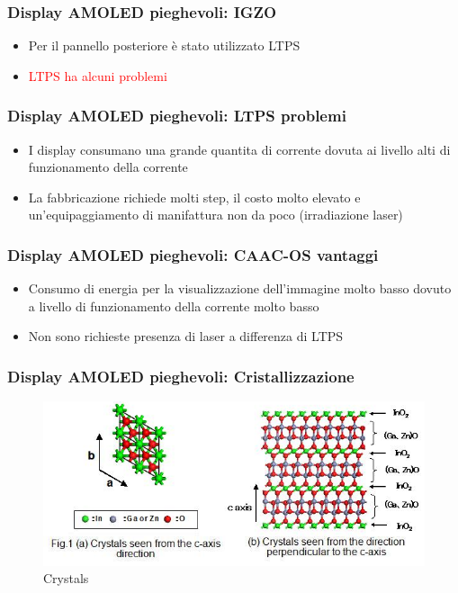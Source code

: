 \documentclass[12pt]{beamer}
\begin{document}
	\begin{frame}
		\frametitle{Display AMOLED pieghevoli: IGZO}
		\begin{itemize}
			\item Per il pannello posteriore è stato utilizzato LTPS
			\pause
			\item \textcolor{red}{LTPS ha alcuni problemi}
		\end{itemize}
	\end{frame}
	\begin{frame}
		\frametitle{Display AMOLED pieghevoli: LTPS problemi}
		\begin{itemize}
			\item I display consumano una grande quantita di corrente dovuta ai livello alti di funzionamento della corrente
			\pause
			\item La fabbricazione richiede molti step, il costo molto elevato e un'equipaggiamento di manifattura non da poco (irradiazione laser)
		\end{itemize}
	\end{frame}
	\begin{frame}
		\frametitle{Display AMOLED pieghevoli: CAAC-OS vantaggi}
		\begin{itemize}
			\item Consumo di energia per la visualizzazione dell'immagine molto basso dovuto a livello di funzionamento della corrente molto basso
			\pause
			\item Non sono richieste presenza di laser a differenza di LTPS
		\end{itemize}
	\end{frame}
	\begin{frame}
		\frametitle{Display AMOLED pieghevoli: Cristallizzazione}
		\begin{figure}
			\centering
			\includegraphics[width=1\linewidth]{"IMMAGINI/Cristalizzazione CAAS"}
			\caption{Crystals}
			\label{fig:cristalizzazione-caas}
		\end{figure}
	\end{frame}
\end{document}
